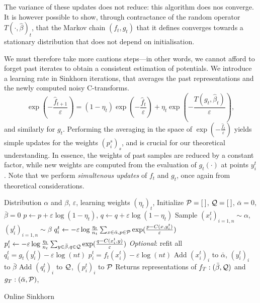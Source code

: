 The variance of these updates does not reduce: this algorithm does nos
converge. It is however possible to show, through contractance of the random
operator $T{(\cdot, \hat \beta)}_t$, that the Markov chain $(f_t, g_t)$ that it
defines converges towards a stationary distribution that does not depend on
initialisation.

We must therefore take more cautions steps---in other words,
we cannot afford to forget past iterates to obtain a consistent estimation of
potentials. We introduce a learning rate in Sinkhorn iterations, that averages
the past representations and the newly computed noisy C-transforms.
\begin{equation}\label{eq:updates}
    \exp(-\frac{\hat f_{t+1}}
    {\varepsilon}) = (1 - \eta_t) \exp(-\frac{\hat f_t}{\varepsilon}) 
    + \eta_t 
    \exp(-\frac{T(g_t, \hat \beta_t)}{\varepsilon}),
\end{equation}
and similarly for $g_t$. Performing the averaging in the space of
$\exp(-\frac{\hat f_{t}}{\varepsilon})$ yields simple updates for the weights
${(p_i^s)}_s$, and is crucial for our theoretical understanding. In essence, the
weights of past samples are reduced by a constant factor, while new weights are
computed from the evaluation of $g_t(\cdot)$ at points $y_i^t$. Note that we
perform \textit{simultenous updates} of $f_t$ and $g_t$, once again from
theoretical considerations.

\begin{algorithm}[t]
    \begin{algorithmic}
    \Input Distribution $\alpha$ and $\beta$, $\varepsilon$, learning weights ${(\eta_t)}_t$,
    \State Initialize $\mathcal{P} = [\:]$, $\mathcal{Q} = [\:]$, $\bar \alpha = 0$, $\bar \beta = 0$
            \State $p \gets p + \varepsilon \log(1 - \eta_t)$,
             \State $q \gets q + \varepsilon \log(1 - \eta_t)$
        \EndFor
        \State Sample $(x_i^t)_{i=1,n} \sim \alpha$, $(y_i^t)_{i=1,n} \sim \beta$
            \State $q_i^t \gets 
            - \varepsilon \log \frac{\eta_t}{n_t} 
            \sum_{x \in \bar \alpha, p \in \mathcal{P}} \exp(\frac{p - C(x, y_i^t)}{\varepsilon})$
            \State $p_i^t \gets 
            - \varepsilon \log \frac{\eta_t}{n_t} 
            \sum_{y \in \bar \beta, q \in \mathcal{Q}} \exp(\frac{q - C(x_i^t, y)}{\varepsilon})$
        \EndFor
        \State \textit{Optional}: refit all $q_i^t = g_t(y_i^t) - \varepsilon \log (nt)$
        \State\hspace{2.45cm} $p_i^t = f_t(x_i^t) - \varepsilon \log (nt)$
        \State Add ${(x_i^t)}_i$ to $\bar \alpha$, ${(y_i^t)}_i$ to $\bar \beta$
        \State Add $(q_i^t)_i$ to $\mathcal{Q}$, $(p_i^t)_i$ to $\mathcal{P}$
    \EndFor
    \State Returns representations of $f_T: (\bar \beta, \mathcal{Q})$ and $g_T: (\bar \alpha, \mathcal{P})$, 
    \end{algorithmic}
    \caption{Online Sinkhorn}\label{alg:online_sinkhorn}
\end{algorithm}


